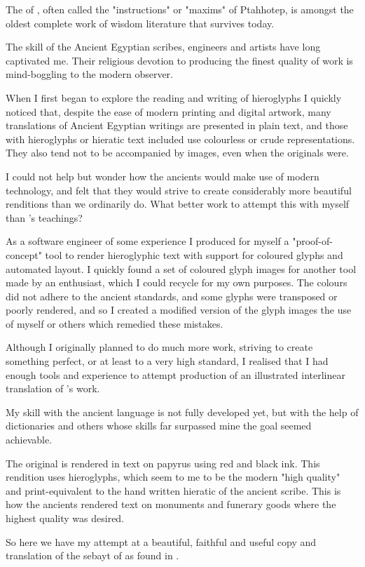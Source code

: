 The \textit{} of , often called the "instructions" or "maxims" of Ptahhotep, is amongst the oldest complete work of wisdom literature that survives today.

The skill of the Ancient Egyptian scribes, engineers and artists have long captivated me. Their religious devotion to producing the finest quality of work is mind-boggling to the modern observer.

When I first began to explore the reading and writing of hieroglyphs I quickly noticed that, despite the ease of modern printing and digital artwork, many translations of Ancient Egyptian writings are presented in plain text, and those with hieroglyphs or hieratic text included use colourless or crude representations. They also tend not to be accompanied by images, even when the originals were.

I could not help but wonder how the ancients would make use of modern technology, and felt that they would strive to create considerably more beautiful renditions than we ordinarily do. What better work to attempt this with myself than 's teachings?

As a software engineer of some experience I produced for myself a "proof-of-concept" tool to render hieroglyphic text with support for coloured glyphs and automated layout. I quickly found a set of coloured glyph images for another tool made by an enthusiast, which I could recycle for my own purposes. The colours did not adhere to the ancient standards, and some glyphs were transposed or poorly rendered, and so I created a modified version of the glyph images the use of myself or others which remedied these mistakes.

Although I originally planned to do much more work, striving to create something perfect, or at least to a very high standard, I realised that I had enough tools and experience to attempt production of an illustrated interlinear translation of 's work.

My skill with the ancient language is not fully developed yet, but with the help of dictionaries and others whose skills far surpassed mine the goal seemed achievable.

The original is rendered in  text on papyrus using red and black ink. This rendition uses hieroglyphs, which seem to me to be the modern "high quality" and print-equivalent to the hand written hieratic of the ancient scribe. This is how the ancients rendered text on monuments and funerary goods where the highest quality was desired.

So here we have my attempt at a beautiful, faithful and useful copy and translation of the sebayt of  as found in .


